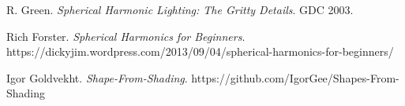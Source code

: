 \documentclass[10pt,twocolumn,letterpaper]{article}
\begin{document}
\begin{thebibliography}{1}
	R. Green.
	\textit{Spherical Harmonic Lighting: The Gritty Details}. 
	GDC 2003.
	
	Rich Forster.
	\textit{Spherical Harmonics for Beginners}. 
	https://dickyjim.wordpress.com/2013/09/04/spherical-harmonics-for-beginners/
	
	
	Igor Goldvekht. 
	\textit{Shape-From-Shading}. 
	https://github.com/IgorGee/Shapes-From-Shading
\end{thebibliography}
\end{document}
